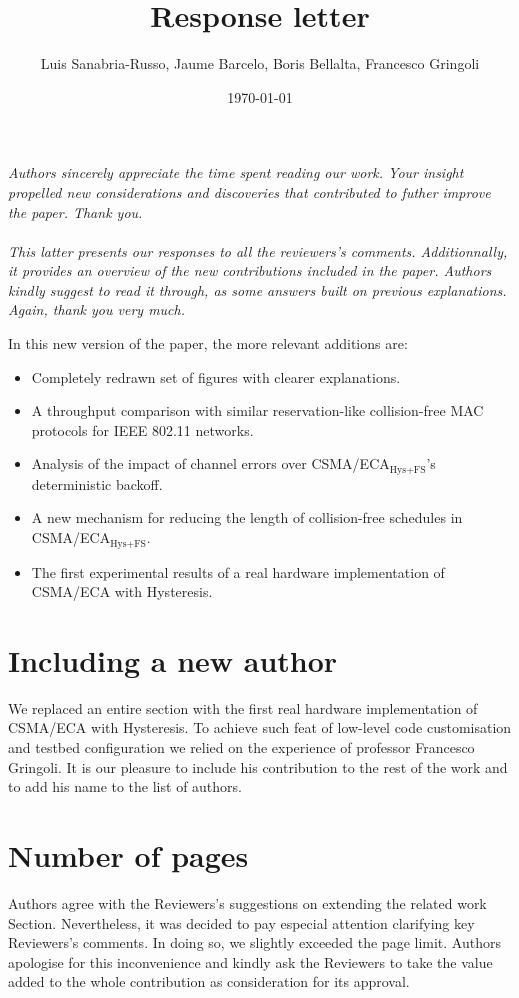 \documentclass[]{article}
\begin{document}
\title{Response letter}
  \author{Luis Sanabria-Russo, Jaume Barcelo, Boris Bellalta, Francesco Gringoli}

\date{\today}
\maketitle
\emph{Authors sincerely appreciate the time spent reading our work. Your insight propelled new considerations and discoveries that contributed to futher improve the paper. Thank you. \\\\This latter presents our responses to all the reviewers's comments. Additionnally, it provides an overview of the new contributions included in the paper. Authors kindly suggest to read it through, as some answers built on previous explanations. Again, thank you very much.\\}

In this new version of the paper, the more relevant additions are:
\begin{itemize}
	\item Completely redrawn set of figures with clearer explanations.
	\item A throughput comparison with similar reservation-like collision-free MAC protocols for IEEE 802.11 networks.
	\item Analysis of the impact of channel errors over CSMA/ECA$_{\text{Hys+FS}}$'s deterministic backoff.
	\item A new mechanism for reducing the length of collision-free schedules in CSMA/ECA$_{\text{Hys+FS}}$.
	\item The first experimental results of a real hardware implementation of CSMA/ECA with Hysteresis.
\end{itemize}

\section*{Including a new author}
We replaced an entire section with the first real hardware implementation of CSMA/ECA with Hysteresis. To achieve such feat of low-level code customisation and testbed configuration we relied on the experience of professor Francesco Gringoli. It is our pleasure to include his contribution to the rest of the work and to add his name to the list of authors.

\section*{Number of pages}
Authors agree with the Reviewers's suggestions on extending the related work Section. Nevertheless, it was decided to pay especial attention clarifying key Reviewers's comments. In doing so, we slightly exceeded the page limit. Authors apologise for this inconvenience and kindly ask the Reviewers to take the value added to the whole contribution as consideration for its approval.
\end{document}
